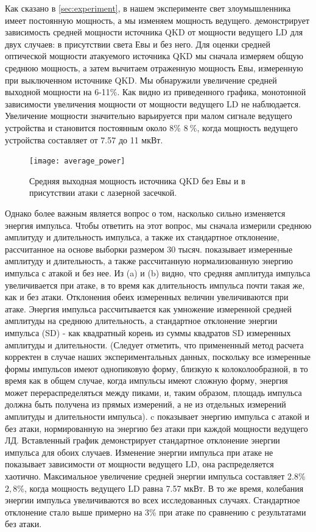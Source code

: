 Как сказано в \cref{sec:experiment}, в нашем эксперименте свет злоумышленника имеет постоянную мощность, а мы изменяем мощность ведущего.  демонстрирует зависимость средней мощности источника QKD от мощности ведущего LD для двух случаев: в присутствии света Евы и без него. Для оценки средней оптической мощности атакуемого источника QKD мы сначала измеряем общую среднюю мощность, а затем вычитаем отраженную мощность Евы, измеренную при выключенном источнике QKD. Мы обнаружили увеличение средней выходной мощности на 6-11\%. Как видно из приведенного графика, монотонной зависимости увеличения мощности от мощности ведущего LD не наблюдается. Увеличение мощности значительно варьируется при малом сигнале ведущего устройства и становится постоянным около 8\% $8~\%$, когда мощность ведущего устройства составляет от 7.57 до 11 мкВт.
\begin{figure}
\texttt{[image: average\_power]}
\caption{Средняя выходная мощность источника QKD без Евы и в присутствии атаки с лазерной засечкой.}
\label{fig:average_power}
\end{figure}
Однако более важным является вопрос о том, насколько сильно изменяется энергия импульса. Чтобы ответить на этот вопрос, мы сначала измерили среднюю амплитуду и длительность импульса, а также их стандартное отклонение, рассчитанное на основе выборки размером 30 тысяч.  показывает измеренные амплитуду и длительность, а также рассчитанную нормализованную энергию импульса с атакой и без нее. Из (a) и (b) видно, что средняя амплитуда импульса увеличивается при атаке, в то время как длительность импульса почти такая же, как и без атаки. Отклонения обеих измеренных величин увеличиваются при атаке. Энергия импульса рассчитывается как умножение измеренной средней амплитуды на среднюю длительность, а стандартное отклонение энергии импульса (SD) - как квадратный корень из суммы квадратов SD измеренных амплитуды и длительности. (Следует отметить, что примененный метод расчета корректен в случае наших экспериментальных данных, поскольку все измеренные формы импульсов имеют однопиковую форму, близкую к колоколообразной, в то время как в общем случае, когда импульсы имеют сложную форму, энергия может перераспределяться между пиками, и, таким образом, площадь импульса должна быть получена из прямых измерений, а не из отдельных измерений амплитуды и длительности импульса). c показывает энергию импульса с атакой и без атаки, нормированную на энергию без атаки при каждой мощности ведущего ЛД. Вставленный график демонстрирует стандартное отклонение энергии импульса для обоих случаев. Изменение энергии импульса при атаке не показывает зависимости от мощности ведущего LD, она распределяется хаотично. Максимальное увеличение средней энергии импульса составляет 2.8\%$2,8\%$, когда мощность ведущего LD равна 7.57 мкВт. В то же время, колебания энергии импульса увеличиваются во всех исследованных случаях. Стандартное отклонение стало выше примерно на 3\% при атаке по сравнению с результатами без атаки.

